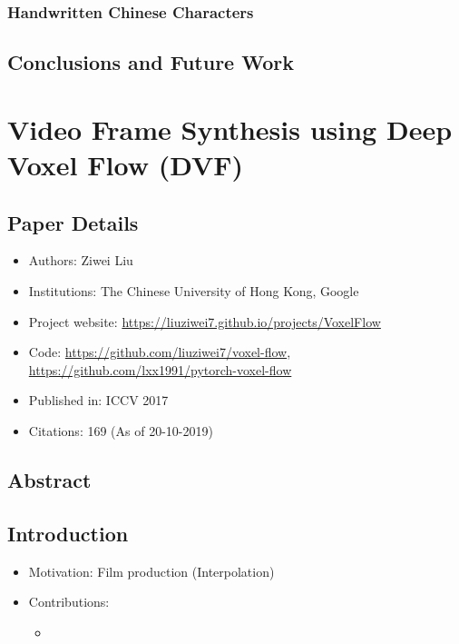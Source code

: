 \documentclass{article}
\begin{document}
    \subsubsection{Handwritten Chinese Characters}\label{subsubsec:Least_Squares_Generative_Adversarial_Networks_(LS_GAN)_ICCV_2017:handwritten-chinese-characters}

    \subsection{Conclusions and Future Work}\label{subsec:Least_Squares_Generative_Adversarial_Networks_(LS_GAN)_ICCV_2017:conclusions-and-future-work}
    \newpage


    \section{Video Frame Synthesis using Deep Voxel Flow (DVF)}\label{sec:Video_Frame_Synthesis_using_Deep_Voxel_Flow_(DVF)}
    \subsection*{Paper Details}
    \begin{itemize}
        \item Authors: Ziwei Liu
        \item Institutions: The Chinese University of Hong Kong, Google
        \item Project website: \url{https://liuziwei7.github.io/projects/VoxelFlow}
        \item Code: \url{https://github.com/liuziwei7/voxel-flow}, \url{https://github.com/lxx1991/pytorch-voxel-flow}
        \item Published in: ICCV 2017
        \item Citations: 169 (As of 20-10-2019)
    \end{itemize}

    \subsection*{Abstract}

    \subsection{Introduction}\label{subsec:Video_Frame_Synthesis_using_Deep_Voxel_Flow_(DVF):introduction}
    \begin{itemize}
        \item Motivation: Film production (Interpolation)
        \item Contributions:
        \begin{itemize}
            \item
        \end{itemize}
    \end{itemize}
\end{document}
